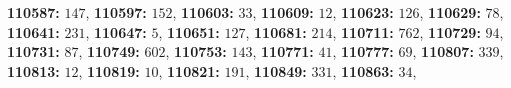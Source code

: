 \textsf{\bfseries 110587:} $147$, \textsf{\bfseries 110597:} $152$, \textsf{\bfseries 110603:} $33$, \textsf{\bfseries 110609:} $12$, \textsf{\bfseries 110623:} $126$, \textsf{\bfseries 110629:} $78$, \textsf{\bfseries 110641:} $231$, \textsf{\bfseries 110647:} $5$, \textsf{\bfseries 110651:} $127$, \textsf{\bfseries 110681:} $214$, \textsf{\bfseries 110711:} $762$, \textsf{\bfseries 110729:} $94$, \textsf{\bfseries 110731:} $87$, \textsf{\bfseries 110749:} $602$, \textsf{\bfseries 110753:} $143$, \textsf{\bfseries 110771:} $41$, \textsf{\bfseries 110777:} $69$, \textsf{\bfseries 110807:} $339$, \textsf{\bfseries 110813:} $12$, \textsf{\bfseries 110819:} $10$, \textsf{\bfseries 110821:} $191$, \textsf{\bfseries 110849:} $331$, \textsf{\bfseries 110863:} $34$, 
